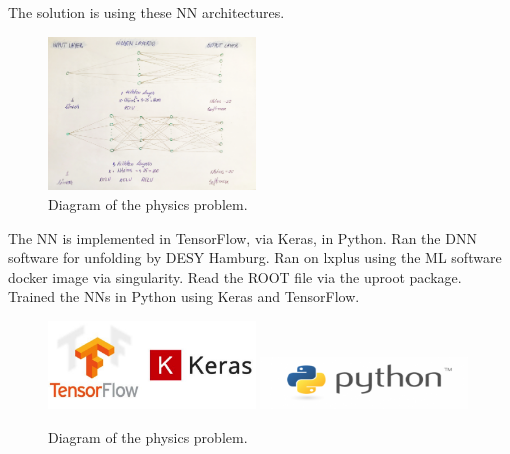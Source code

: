 The solution is using these NN architectures.

\begin{figure}[h]
  \centering
  \includegraphics[width=0.49\textwidth]{../presentation/plots/NNArchitecture.jpg}
  \caption{Diagram of the physics problem.}
  \label{fig:NNArchitecture}
\end{figure}

The NN is implemented in TensorFlow, via Keras, in Python. Ran the DNN software for unfolding by DESY Hamburg. Ran on lxplus using the ML software docker image via singularity. Read the ROOT file via the uproot package. Trained  the NNs in Python using Keras and TensorFlow.

\begin{figure}[h]
  \centering
  \includegraphics[width=0.49\textwidth]{../presentation/plots/TensorFlow_Keras.png}
  \includegraphics[width=0.49\textwidth]{../presentation/plots/Python.png}
  \caption{Diagram of the physics problem.}
  \label{fig:NNArchitecture}
\end{figure}

